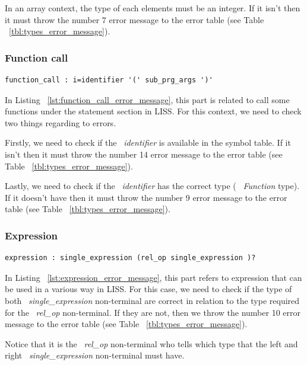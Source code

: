 \documentclass[
  oneside,
  11pt, a4paper,
  footinclude=true,
  headinclude=true,
  cleardoublepage=empty
]{scrbook}
\begin{document}
In an array context, the type of each elements must be an integer. If it isn't then it must throw the number 7 error message to the error table (see Table ~\ref{tbl:types_error_message}).

\subsubsection{Function call}

\begin{lstlisting}[caption={Function\_call rule in LISS},label={lst:function_call_error_message}]
  function_call : i=identifier '(' sub_prg_args ')'
\end{lstlisting}

In Listing ~\ref{lst:function_call_error_message}, this part is related to call some functions under the statement section in LISS.
For this context, we need to check two things regarding to errors.

Firstly, we need to check if the ~\textit{identifier} is available in the symbol table. If it isn't then it must throw the number 14 error message to the error table (see Table ~\ref{tbl:types_error_message}).

Lastly, we need to check if the ~\textit{identifier} has the correct type ( ~\textit{Function} type). If it doesn't have then it must throw the number 9 error message to the error table (see Table ~\ref{tbl:types_error_message}).

\subsubsection{Expression}

\begin{lstlisting}[caption={Expression rule in LISS}, label={lst:expression_error_message}]
  expression : single_expression (rel_op single_expression )?
\end{lstlisting}

In Listing ~\ref{lst:expression_error_message}, this part refers to expression that can be used in a various way in LISS. 
For this case, we need to check if the type of both ~\textit{single\_expression} non-terminal are correct in relation to the type required for the ~\textit{rel\_op} non-terminal. If they are not, then we throw the number 10 error message to the error table (see Table ~\ref{tbl:types_error_message}). 

Notice that it is the ~\textit{rel\_op} non-terminal who tells which type that the left and right ~\textit{single\_expression} non-terminal must have.
\end{document}
